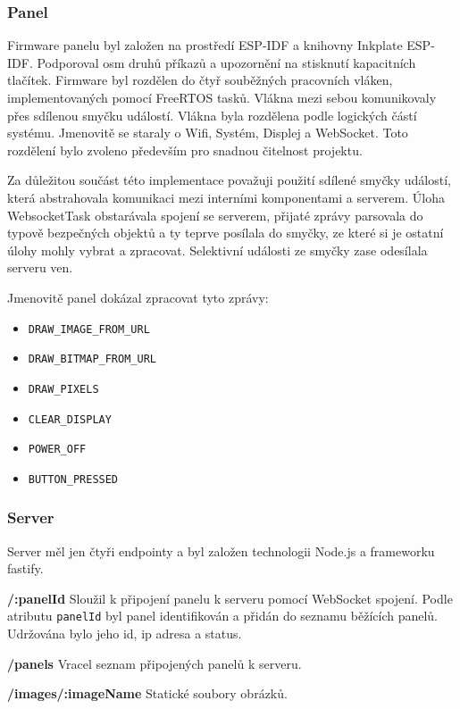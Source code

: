 \subsubsection{Panel}
Firmware panelu byl založen na prostředí ESP-IDF a knihovny Inkplate ESP-IDF. Podporoval osm druhů příkazů a upozornění na stisknutí kapacitních tlačítek. Firmware byl rozdělen do čtyř souběžných pracovních vláken, implementovaných pomocí FreeRTOS tasků. Vlákna mezi sebou komunikovaly přes sdílenou smyčku událostí. Vlákna byla rozdělena podle logických částí systému. Jmenovitě se staraly o Wifi, Systém, Displej a WebSocket. Toto rozdělení bylo zvoleno především pro snadnou čitelnost projektu.

Za důležitou součást této implementace považuji použití sdílené smyčky událostí, která abstrahovala komunikaci mezi interními komponentami a serverem. Úloha WebsocketTask obstarávala spojení se serverem, přijaté zprávy parsovala do typově bezpečných objektů a ty teprve posílala do smyčky, ze které si je ostatní úlohy mohly vybrat a zpracovat. Selektivní události ze smyčky zase odesílala serveru ven.

Jmenovitě panel dokázal zpracovat tyto zprávy:

\begin{itemize}
    \item \verb|DRAW_IMAGE_FROM_URL|
    \item \verb|DRAW_BITMAP_FROM_URL|
    \item \verb|DRAW_PIXELS|
    \item \verb|CLEAR_DISPLAY|
    \item \verb|POWER_OFF|
    \item \verb|BUTTON_PRESSED|
\end{itemize}

\subsubsection{Server}
Server měl jen čtyři endpointy a byl založen technologii Node.js a frameworku fastify.

\textbf{/:panelId} Sloužil k připojení panelu k serveru pomocí WebSocket spojení. Podle atributu \lstinline{panelId} byl panel identifikován a přidán do seznamu běžících panelů. Udržována bylo jeho id, ip adresa a status.

\textbf{/panels} Vracel seznam připojených panelů k serveru.

\textbf{/images/:imageName} Statické soubory obrázků.

